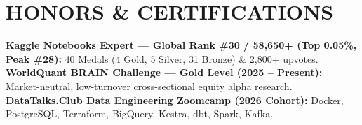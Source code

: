 \documentclass[10pt,a4paper]{article}
\begin{document}
\section*{HONORS \& CERTIFICATIONS}
\noindent\textbf{Kaggle Notebooks Expert --- Global Rank \#30 / 58,650+ (Top 0.05\%, Peak \#28):} 40 Medals (4 Gold, 5 Silver, 31 Bronze) \& 2,800+ upvotes.\\
\noindent\textbf{WorldQuant BRAIN Challenge --- Gold Level (2025 -- Present):} Market-neutral, low-turnover cross-sectional equity alpha research.\\
\noindent\textbf{DataTalks.Club Data Engineering Zoomcamp (2026 Cohort):} Docker, PostgreSQL, Terraform, BigQuery, Kestra, dbt, Spark, Kafka.
\end{document}
